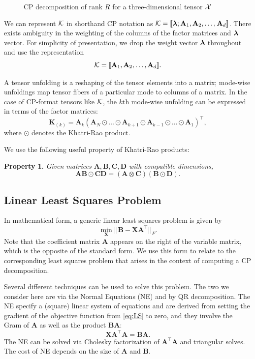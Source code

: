 \documentclass{article}
\newtheorem{property}{Property}
\newcommand{\mat}[1]{\mathbf{#1}}
\newcommand{\V}[2][]{\bm{#1{\mathbf{\MakeLowercase{#2}}}}} 		%
\newcommand{\T}[2][]{#1{\mathbf{\cal{#2}}}} 						%
\begin{document}
\begin{figure}[ht!]
\centering

\caption{CP decomposition of rank $R$ for a three-dimensional tensor $\T{X}$ \label{fig:3d-cp-decomp}}
\end{figure}
We can represent $\T[]{K}$ in shorthand CP notation as $\T{K} = [\![\V{\lambda};\mat{A}_1,\mat{A}_2, \dots,\mat{A}_d ]\!]$. 
There exists ambiguity in the weighting of the columns of the factor matrices and $\V{\lambda}$ vector.
For simplicity of presentation, we drop the weight vector $\V{\lambda}$ throughout and use the representation
$$\T{K} = [\![\mat{A}_1,\mat{A}_2, \dots,\mat{A}_d ]\!].$$

A tensor unfolding is a reshaping of the tensor elements into a matrix; mode-wise unfoldings map tensor fibers of a particular mode to columns of a matrix.
In the case of CP-format tensors like $\T{K}$, the $k$th mode-wise unfolding can be expressed in terms of the factor matrices:
$$\mat{K}_{(k)} = \mat{A}_k (\mat{A}_N \odot \dots \odot \mat{A}_{k+1} \odot \mat{A}_{k-1} \odot \dots \odot \mat{A}_1)^\top,$$
where $\odot$ denotes the Khatri-Rao product.

We use the following useful property of Khatri-Rao products:
\begin{property}
\label{prop:krnkrp}
Given matrices $\mat{A},\mat{B},\mat{C},\mat{D}$ with compatible dimensions, 
$$\mat{A}\mat{B} \odot \mat{C}\mat{D} = (\mat{A} \otimes \mat{C}) (\mat{B} \odot \mat{D}).$$
\end{property}

\subsection{Linear Least Squares Problem}
\label{sec:LS}

In mathematical form, a generic linear least squares problem is given by 
\begin{equation}
\label{eq:LS}
\min_{\mat{X}}||\mat{B} - \mat{X}\mat{A}^\top||_{F}.
\end{equation}
Note that the coefficient matrix $\mat{A}$ appears on the right of the variable matrix, which is the opposite of the standard form.
We use this form to relate to the corresponding least squares problem that arises in the context of computing a CP decomposition.

Several different techniques can be used to solve this problem.
The two we consider here are via the Normal Equations (NE) and by QR decomposition.
The NE specify a (square) linear system of equations and are derived from setting the gradient of the objective function from \cref{eq:LS} to zero, and they involve the Gram of $\mat{A}$ as well as the product $\mat{B}\mat{A}$:
\begin{equation}
\label{eq:NE}
\mat{X}\mat{A}^\top\mat{A} = \mat{B}\mat{A}.
\end{equation}
The NE can be solved via Cholesky factorization of $\mat{A}^\top\mat{A}$ and triangular solves.
The cost of NE depends on the size of $\mat{A}$ and $\mat{B}$. 
\end{document}
